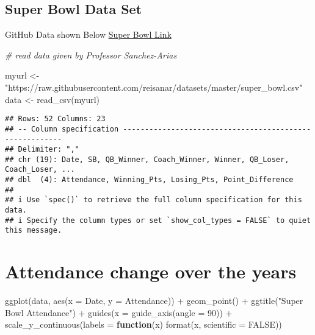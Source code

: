 \documentclass[
]{article}
\newenvironment{Shaded}{\begin{snugshade}}{\end{snugshade}}
\newcommand{\AttributeTok}[1]{\textcolor[rgb]{0.77,0.63,0.00}{#1}}
\newcommand{\CommentTok}[1]{\textcolor[rgb]{0.56,0.35,0.01}{\textit{#1}}}
\newcommand{\ConstantTok}[1]{\textcolor[rgb]{0.00,0.00,0.00}{#1}}
\newcommand{\ControlFlowTok}[1]{\textcolor[rgb]{0.13,0.29,0.53}{\textbf{#1}}}
\newcommand{\DecValTok}[1]{\textcolor[rgb]{0.00,0.00,0.81}{#1}}
\newcommand{\FunctionTok}[1]{\textcolor[rgb]{0.00,0.00,0.00}{#1}}
\newcommand{\NormalTok}[1]{#1}
\newcommand{\OtherTok}[1]{\textcolor[rgb]{0.56,0.35,0.01}{#1}}
\newcommand{\SpecialCharTok}[1]{\textcolor[rgb]{0.00,0.00,0.00}{#1}}
\newcommand{\StringTok}[1]{\textcolor[rgb]{0.31,0.60,0.02}{#1}}
\begin{document}
\hypertarget{super-bowl-data-set}{%
\subsection{Super Bowl Data Set}\label{super-bowl-data-set}}

GitHub Data shown Below
\href{https://github.com/reisanar/datasets/blob/master/super_bowl.csv}{Super
Bowl Link}

\begin{Shaded}
\begin{Highlighting}[]
\CommentTok{\# read data given by Professor Sanchez{-}Arias}

\NormalTok{myurl }\OtherTok{\textless{}{-}} \StringTok{"https://raw.githubusercontent.com/reisanar/datasets/master/super\_bowl.csv"}
\NormalTok{data }\OtherTok{\textless{}{-}} \FunctionTok{read\_csv}\NormalTok{(myurl)}
\end{Highlighting}
\end{Shaded}

\begin{verbatim}
## Rows: 52 Columns: 23
## -- Column specification --------------------------------------------------------
## Delimiter: ","
## chr (19): Date, SB, QB_Winner, Coach_Winner, Winner, QB_Loser, Coach_Loser, ...
## dbl  (4): Attendance, Winning_Pts, Losing_Pts, Point_Difference
## 
## i Use `spec()` to retrieve the full column specification for this data.
## i Specify the column types or set `show_col_types = FALSE` to quiet this message.
\end{verbatim}

\hypertarget{attendance-change-over-the-years}{%
\section{Attendance change over the
years}\label{attendance-change-over-the-years}}

\begin{Shaded}
\begin{Highlighting}[]
\FunctionTok{ggplot}\NormalTok{(data, }\FunctionTok{aes}\NormalTok{(}\AttributeTok{x =}\NormalTok{ Date, }\AttributeTok{y =}\NormalTok{ Attendance)) }\SpecialCharTok{+}
  \FunctionTok{geom\_point}\NormalTok{() }\SpecialCharTok{+} 
  \FunctionTok{ggtitle}\NormalTok{(}\StringTok{"Super Bowl Attendance"}\NormalTok{) }\SpecialCharTok{+}
  \FunctionTok{guides}\NormalTok{(}\AttributeTok{x =}  \FunctionTok{guide\_axis}\NormalTok{(}\AttributeTok{angle =} \DecValTok{90}\NormalTok{)) }\SpecialCharTok{+}
  \FunctionTok{scale\_y\_continuous}\NormalTok{(}\AttributeTok{labels =} \ControlFlowTok{function}\NormalTok{(x) }\FunctionTok{format}\NormalTok{(x, }\AttributeTok{scientific =} \ConstantTok{FALSE}\NormalTok{))}
\end{Highlighting}
\end{Shaded}
\end{document}
